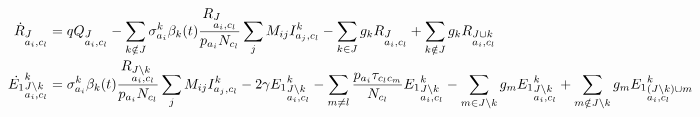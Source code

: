 \documentclass[12pt]{article}
\begin{document}
\begin{footnotesize}
\begin{align}
  \label{eq:full}
\dot{R}_{\begin{subarray}{l}J\\ a_i, c_l \end{subarray}} &=  q Q_{\begin{subarray}{l}J  \\ a_i,
    c_l \end{subarray}} - \sum_{k \notin J} \sigma_{a_i}^k \beta_k(t)
\frac{R_{\begin{subarray}{l}J\\ a_i, c_l \end{subarray}}}{p_{a_i} N_{c_l}} \sum_j M_{ij}
I^k_{a_j,c_l} -\sum_{k
  \in J} g_k R_{\begin{subarray}{l}J\\ a_i, c_l \end{subarray}} + \sum_{k
  \notin J} g_k R_{\begin{subarray}{l}J \cup k \\ a_i, c_l \end{subarray}}  \\
\dot{E_1}^k_{\begin{subarray}{l}J \setminus k\\ a_i,
    c_l \end{subarray}} &=\sigma_{a_i}^k \beta_k(t)
\frac{R_{\begin{subarray}{l}J \setminus k\\ a_i, c_l \end{subarray}}}{p_{a_i} N_{c_l}} \sum_j M_{ij}
I^k_{a_j,c_l} -2 \gamma {E_1}^k_{\begin{subarray}{l}J
    \setminus k\\ a_i, c_l \end{subarray}} -\sum_{m\neq l}
\frac{p_{a_i} \tau_{c_lc_m}}{N_{c_l}} {E_1}^k_{\begin{subarray}{l}J \setminus k\\ a_i,
    c_l \end{subarray}} -\sum_{m
  \in J \setminus k} g_m {E_1}^k_{\begin{subarray}{l}J \setminus k\\ a_i, c_l \end{subarray}} + \sum_{m
  \notin J \setminus k} g_m {E_1}^k_{\begin{subarray}{l} (J \setminus k) \cup m \\ a_i, c_l \end{subarray}} 
\notag \\

\end{align}
\end{footnotesize}
\end{document}

